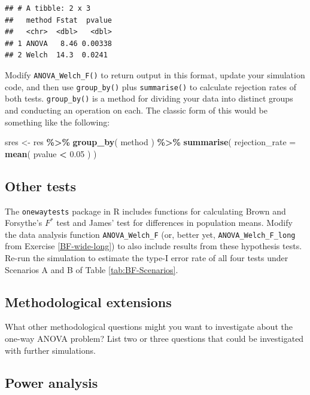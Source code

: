 \documentclass[
]{book}
\newenvironment{Shaded}{\begin{snugshade}}{\end{snugshade}}
\newcommand{\AttributeTok}[1]{\textcolor[rgb]{0.13,0.29,0.53}{#1}}
\newcommand{\FloatTok}[1]{\textcolor[rgb]{0.00,0.00,0.81}{#1}}
\newcommand{\FunctionTok}[1]{\textcolor[rgb]{0.13,0.29,0.53}{\textbf{#1}}}
\newcommand{\NormalTok}[1]{#1}
\newcommand{\OtherTok}[1]{\textcolor[rgb]{0.56,0.35,0.01}{#1}}
\newcommand{\SpecialCharTok}[1]{\textcolor[rgb]{0.81,0.36,0.00}{\textbf{#1}}}
\begin{document}
\begin{verbatim}
## # A tibble: 2 x 3
##   method Fstat  pvalue
##   <chr>  <dbl>   <dbl>
## 1 ANOVA   8.46 0.00338
## 2 Welch  14.3  0.0241
\end{verbatim}

Modify \texttt{ANOVA\_Welch\_F()} to return output in this format, update your simulation code, and then use \texttt{group\_by()} plus \texttt{summarise()} to calculate rejection rates of both tests.
\texttt{group\_by()} is a method for dividing your data into distinct groups and conducting an operation on each.
The classic form of this would be something like the following:

\begin{Shaded}
\begin{Highlighting}[]
\NormalTok{sres }\OtherTok{\textless{}{-}} 
\NormalTok{  res }\SpecialCharTok{\%\textgreater{}\%} 
  \FunctionTok{group\_by}\NormalTok{( method ) }\SpecialCharTok{\%\textgreater{}\%}
  \FunctionTok{summarise}\NormalTok{( }\AttributeTok{rejection\_rate =} \FunctionTok{mean}\NormalTok{( pvalue }\SpecialCharTok{\textless{}} \FloatTok{0.05}\NormalTok{ ) )}
\end{Highlighting}
\end{Shaded}

\subsection{Other tests}\label{BF-other-tests}

The \texttt{onewaytests} package in R includes functions for calculating Brown and Forsythe's \(F^*\) test and James' test for differences in population means. Modify the data analysis function \texttt{ANOVA\_Welch\_F} (or, better yet, \texttt{ANOVA\_Welch\_F\_long} from Exercise \ref{BF-wide-long}) to also include results from these hypothesis tests. Re-run the simulation to estimate the type-I error rate of all four tests under Scenarios A and B of Table \ref{tab:BF-Scenarios}.

\subsection{Methodological extensions}\label{methodological-extensions}

What other methodological questions might you want to investigate about the one-way ANOVA problem? List two or three questions that could be investigated with further simulations.

\subsection{Power analysis}\label{power-analysis}
\end{document}
